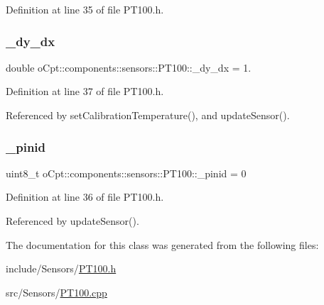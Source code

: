 Definition at line 35 of file P\+T100.\+h.

\hypertarget{classo_cpt_1_1components_1_1sensors_1_1_p_t100_a3576ceab93d9cedce804469f72087155}{}\label{classo_cpt_1_1components_1_1sensors_1_1_p_t100_a3576ceab93d9cedce804469f72087155} 
\subsubsection{\texorpdfstring{\+\_\+dy\+\_\+dx}{\_dy\_dx}}
{\footnotesize\ttfamily double o\+Cpt\+::components\+::sensors\+::\+P\+T100\+::\+\_\+dy\+\_\+dx = 1.\hspace{0.3cm}{\ttfamily [private]}}



Definition at line 37 of file P\+T100.\+h.



Referenced by set\+Calibration\+Temperature(), and update\+Sensor().

\hypertarget{classo_cpt_1_1components_1_1sensors_1_1_p_t100_ac49f21dd8a8f2c7cd7e377512f5e9b25}{}\label{classo_cpt_1_1components_1_1sensors_1_1_p_t100_ac49f21dd8a8f2c7cd7e377512f5e9b25} 
\subsubsection{\texorpdfstring{\+\_\+pinid}{\_pinid}}
{\footnotesize\ttfamily uint8\+\_\+t o\+Cpt\+::components\+::sensors\+::\+P\+T100\+::\+\_\+pinid = 0\hspace{0.3cm}{\ttfamily [private]}}



Definition at line 36 of file P\+T100.\+h.



Referenced by update\+Sensor().



The documentation for this class was generated from the following files\+:\begin{DoxyCompactItemize}
\item 
include/\+Sensors/\hyperlink{_p_t100_8h}{P\+T100.\+h}\item 
src/\+Sensors/\hyperlink{_p_t100_8cpp}{P\+T100.\+cpp}\end{DoxyCompactItemize}
